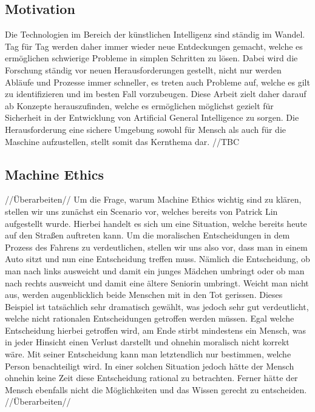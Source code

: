         \subsection{Motivation}
            Die Technologien im Bereich der künstlichen Intelligenz sind ständig im Wandel. Tag für Tag
            werden daher immer wieder neue Entdeckungen gemacht, welche es ermöglichen schwierige Probleme
            in simplen Schritten zu lösen. Dabei wird die Forschung ständig vor neuen Herausforderungen
            gestellt, nicht nur werden Abläufe und Prozesse immer schneller, es treten auch Probleme auf,
            welche es gilt zu identifizieren und im besten Fall vorzubeugen. Diese Arbeit zielt daher
            darauf ab Konzepte herauszufinden, welche es ermöglichen möglichst gezielt für Sicherheit
            in der Entwicklung von Artificial General Intelligence zu sorgen. Die Herausforderung eine
            sichere Umgebung sowohl für Mensch als auch für die Maschine aufzustellen, stellt somit das
            Kernthema dar. //TBC

        \subsection{Machine Ethics}
            //Überarbeiten//
            Um die Frage, warum Machine Ethics wichtig sind zu klären, stellen wir uns zunächst ein
            Scenario vor, welches bereits von Patrick Lin aufgestellt wurde. \cite[p. 70]{maurer_gerdes_lenz_winner_2015}
            Hierbei handelt es sich um eine Situation, welche bereits heute auf den
            Straßen auftreten kann. Um die moralischen Entscheidungen in dem Prozess des Fahrens zu
            verdeutlichen, stellen wir uns also vor, dass man in einem Auto sitzt und nun eine
            Entscheidung treffen muss. Nämlich die Entscheidung, ob man nach links ausweicht und damit
            ein junges Mädchen umbringt oder ob man nach rechts ausweicht und damit eine ältere
            Seniorin umbringt. Weicht man nicht aus, werden augenblicklich beide Menschen mit in den
            Tot gerissen. Dieses Beispiel ist tatsächlich sehr dramatisch gewählt, was jedoch sehr gut
            verdeutlicht, welche nicht rationalen Entscheidungen getroffen werden müssen. Egal welche
            Entscheidung hierbei getroffen wird, am Ende stirbt mindestens ein Mensch, was in jeder
            Hinsicht einen Verlust darstellt und ohnehin moralisch nicht korrekt wäre. \cite[p. 70]{maurer_gerdes_lenz_winner_2015}
            Mit seiner Entscheidung kann man letztendlich nur bestimmen, welche Person benachteiligt
            wird. In einer solchen Situation jedoch hätte der Mensch ohnehin keine Zeit diese Entscheidung
            rational zu betrachten. Ferner hätte der Mensch ebenfalls nicht die Möglichkeiten und
            das Wissen gerecht zu entscheiden.
            //Überarbeiten//

